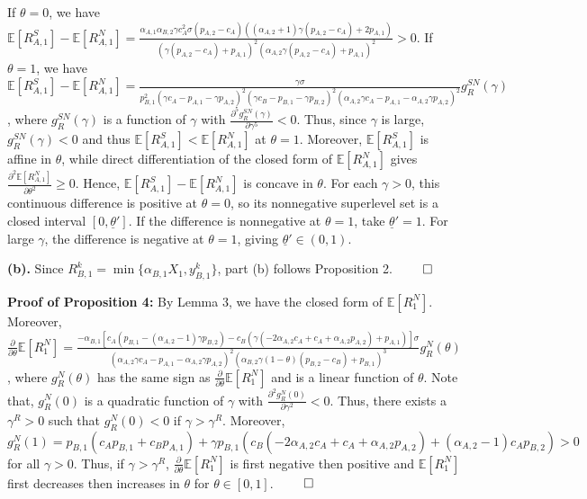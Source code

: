\documentclass[nonblindrev,copyedit]{informs1}
\begin{document}
\begin{APPENDICES}
If $\theta = 0$, we have $\mathbb{E}[R^S_{A,1}] - \mathbb{E}[R^N_{A,1}] = \frac{\alpha_{A,1} \alpha_{B,2} \gamma  c_{A}^2 \sigma  (p_{A,2}-c_{A}) ((\alpha_{A,2}+1) \gamma  (p_{A,2}-c_{A})+2 p_{A,1})}{(\gamma  (p_{A,2}-c_{A})+p_{A,1})^2 (\alpha_{A,2} \gamma  (p_{A,2}-c_{A})+p_{A,1})^2}> 0$. If $\theta = 1$, we have $\mathbb{E}[R^S_{A,1}] - \mathbb{E}[R^N_{A,1}] = \frac{\gamma \sigma}{p_{B,1}^2 (\gamma  c_A-p_{A,1}-\gamma  p_{A,2})^2 (\gamma  c_B-p_{B,1}-\gamma  p_{B,2})^2 (\alpha_{A,2}\gamma  c_A-p_{A,1}-\alpha_{A,2}\gamma  p_{A,2})^2} g^{SN}_R(\gamma)$, where $g^{SN}_R(\gamma)$ is a function of $\gamma$ with $\frac{\partial^5 g^{SN}_R(\gamma)}{\partial \gamma^5} < 0$. Thus, since $\gamma$ is large, $g^{SN}_R(\gamma) < 0$ and thus $\mathbb{E}[R^S_{A,1}] < \mathbb{E}[R^N_{A,1}]$ at $\theta = 1$. Moreover, $\mathbb{E}[R_{A,1}^S]$ is affine in $\theta$, while direct differentiation of the closed form of $\mathbb{E}[R_{A,1}^N]$
gives $\frac{\partial^2 \mathbb{E}[R_{A,1}^N]}{\partial \theta^2} \geq 0$. Hence, $\mathbb{E}[R_{A,1}^S]-\mathbb{E}[R_{A,1}^N]$ is concave in $\theta$. For each $\gamma>0$, this continuous difference is positive at $\theta=0$, so its nonnegative superlevel set is a closed interval $[0,\underline{\theta}']$. If the difference is nonnegative at $\theta=1$, take $\underline{\theta}'=1$. For large $\gamma$, the difference is negative at $\theta=1$, giving $\underline{\theta}'\in(0,1)$.

{\bf (b).} Since $R_{B,1}^k=\min\{\alpha_{B,1} X_1, y_{B,1}^k\}$, part (b) follows Proposition 2.
$\qed$

{\bf Proof of Proposition 4:} By Lemma 3, we have the closed form of $\mathbb{E} [R^{N}_{1}]$. Moreover, $\frac{\partial }{\partial \theta}\mathbb{E} [R^{N}_{1}] = \frac{- \alpha_{B,1} [c_{A} (p_{B,1}-(\alpha_{A,2}-1) \gamma  p_{B,2})-c_{B} (\gamma  (-2 \alpha_{A,2} c_{A}+c_{A}+\alpha_{A,2} p_{A,2})+p_{A,1})] \sigma}{(\alpha_{A,2}\gamma  c_{A}-p_{A,1}-\alpha_{A,2}\gamma  p_{A,2})^2 (\alpha_{B,2} \gamma  (1-\theta ) (p_{B,2}-c_{B})+p_{B,1})^3} g^{N}_R(\theta)$, where $g^{N}_R(\theta)$ has the same sign as $\frac{\partial }{\partial \theta}\mathbb{E} [R^{N}_{1}]$ and is a linear function of $\theta$.
Note that, $g^{N}_R(0)$ is a quadratic function of $\gamma$ with $\frac{\partial^2 g^{N}_R(0)}{\partial \gamma^2} <0$. Thus, there exists a $\gamma^R>0$ such that $g^{N}_R(0) <0$ if $\gamma > \gamma^R$. Moreover, $g^{N}_R(1) = p_{B,1} (c_{A} p_{B,1}+c_{B} p_{A,1})+\gamma  p_{B,1} (c_{B} (-2 \alpha_{A,2} c_{A}+c_{A}+\alpha_{A,2} p_{A,2})+(\alpha_{A,2}-1) c_{A} p_{B,2}) > 0$ for all $\gamma > 0$.
Thus, if $\gamma > \gamma^R$, $\frac{\partial }{\partial \theta}\mathbb{E} [R^{N}_{1}]$ is first negative then positive and $\mathbb{E} [R^{N}_{1}]$ first decreases then increases in $\theta$ for $\theta \in [0,1]$. $\qed$


\end{APPENDICES}
\end{document}
